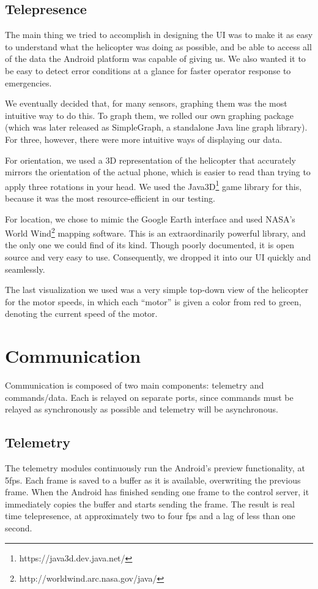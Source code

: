 \subsection{Telepresence}
The main thing we tried to accomplish in designing the UI was to make
it as easy to understand what the helicopter was doing as possible,
and be able to access all of the data the Android platform was capable
of giving us. We also wanted it to be easy to detect error conditions
at a glance for faster operator response to emergencies.

We eventually decided that, for many sensors, graphing them was the
most intuitive way to do this. To graph them, we rolled our own
graphing package (which was later released as SimpleGraph, a standalone
Java line graph library). For three, however, there were more
intuitive ways of displaying our data. 

For orientation, we used a 3D representation of the helicopter that
accurately mirrors the orientation of the actual phone, which is
easier to read than trying to apply three rotations in your head. We
used the Java3D\footnote{https://java3d.dev.java.net/} game library
for this, because it was the most resource-efficient in our testing. 

For location, we chose to mimic the Google Earth interface and used
NASA's World Wind\footnote{http://worldwind.arc.nasa.gov/java/}
mapping software. This is an extraordinarily powerful library, and the
only one we could find of its kind. Though poorly documented, it is open
source and very easy to use.  Consequently, we dropped it into our UI
quickly and seamlessly. 

The last visualization we used was a very simple top-down view of the
helicopter for the motor speeds, in which each ``motor'' is given a
color from red to green, denoting the current speed of the motor.

\section{Communication}
Communication is composed of two main components:‭ ‬telemetry and
commands/data.‭ ‬Each is relayed on separate ports,‭ ‬since commands must
be relayed as synchronously as possible and telemetry will be
asynchronous.

\subsection{Telemetry}
The telemetry modules continuously run the Android's preview
functionality,‭ ‬at‭ ‬5fps.‭  ‬Each frame is saved to a buffer as it is
available,‭ ‬overwriting the previous frame.‭  ‬When the Android has
finished sending one frame to the control server,‭ ‬it immediately
copies the buffer and starts sending the frame.‭  ‬The result is real
time telepresence,‭ ‬at approximately two to four fps and a lag of
less than one second.

